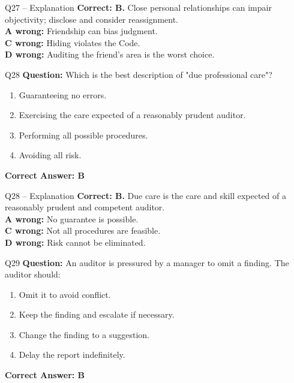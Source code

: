 \documentclass[aspectratio=169,10pt]{beamer}
\begin{document}
	\begin{frame}[t]{Q27 -- Explanation}
		\small
		\textbf{Correct: B.} Close personal relationships can impair objectivity; disclose and consider reassignment. \\[4pt]
		\textbf{A wrong:} Friendship can bias judgment. \\[2pt]
		\textbf{C wrong:} Hiding violates the Code. \\[2pt]
		\textbf{D wrong:} Auditing the friend's area is the worst choice.
	\end{frame}
	
	\begin{frame}[t]{Q28}
		\small
		\textbf{Question:} Which is the best description of "due professional care"?
		\begin{enumerate}[label=\Alph*.,itemsep=1pt,topsep=2pt]
			\item Guaranteeing no errors.
			\item Exercising the care expected of a reasonably prudent auditor.
			\item Performing all possible procedures.
			\item Avoiding all risk.
		\end{enumerate}
		\vspace{4pt}
		\textbf{Correct Answer: B}
	\end{frame}
	
	\begin{frame}[t]{Q28 -- Explanation}
		\small
		\textbf{Correct: B.} Due care is the care and skill expected of a reasonably prudent and competent auditor. \\[4pt]
		\textbf{A wrong:} No guarantee is possible. \\[2pt]
		\textbf{C wrong:} Not all procedures are feasible. \\[2pt]
		\textbf{D wrong:} Risk cannot be eliminated.
	\end{frame}
	
	\begin{frame}[t]{Q29}
		\small
		\textbf{Question:} An auditor is pressured by a manager to omit a finding. The auditor should:
		\begin{enumerate}[label=\Alph*.,itemsep=1pt,topsep=2pt]
			\item Omit it to avoid conflict.
			\item Keep the finding and escalate if necessary.
			\item Change the finding to a suggestion.
			\item Delay the report indefinitely.
		\end{enumerate}
		\vspace{4pt}
		\textbf{Correct Answer: B}
	\end{frame}
	
\end{document}

